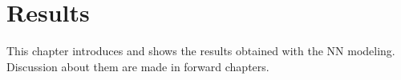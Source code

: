 \chapter{Results}\label{sec:results}

This chapter introduces and shows the results obtained with the NN modeling. Discussion about them are made in forward chapters.